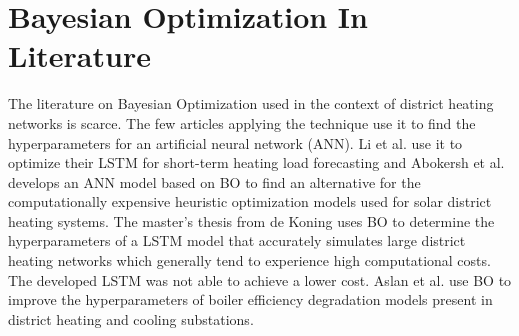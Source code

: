 \section{Bayesian Optimization In Literature}
The literature on Bayesian Optimization used in the context of district heating networks is scarce. The few articles applying the technique use it to find the hyperparameters for an artificial neural network (ANN). Li et al. \cite{LIbayesian} use it to optimize their LSTM for short-term heating load forecasting and Abokersh et al. \cite{ABOKERSH2020403} develops an ANN model based on BO to find an alternative for the computationally expensive heuristic optimization models used for solar district heating systems. The master's thesis from de Koning \cite{deKoning2020} uses BO to determine the hyperparameters of a LSTM model that accurately simulates large district heating networks which generally tend to experience high computational costs. The developed LSTM was not able to achieve a lower cost. Aslan et al. \cite{Aslan06062025} use BO to improve the hyperparameters of boiler efficiency degradation models present in district heating and cooling substations.   

